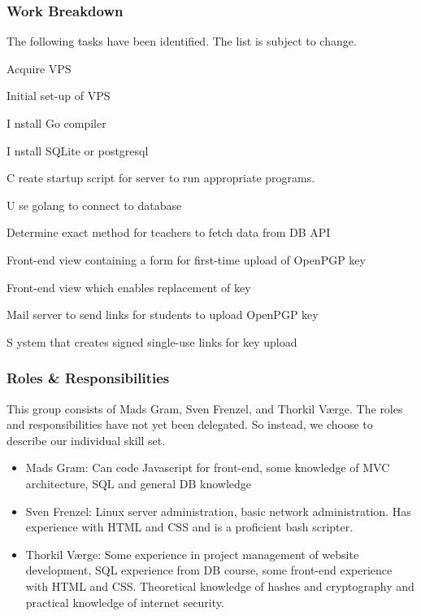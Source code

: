 \documentclass[11pt,a4paper]{report}
\let\OldItem\item
\newcommand{\SubItemStart}[1]{%
    \let\item\SubItemEnd
    \begin{SubItemList}[resume]%
        \OldItem #1%
}
\newcommand{\SubItemMiddle}[1]{%
    \OldItem #1%
}
\newcommand{\SubItemEnd}[1]{%
    \end{SubItemList}%
    \let\item\OldItem
    \item #1%
}
\newcommand*{\SubItem}[1]{%
    \let\SubItem\SubItemMiddle%
    \SubItemStart{#1}%
}%
\begin{document}
\subsubsection{Work Breakdown}
The following tasks have been identified. The list is subject to change.
\begin{itemize}
\item Acquire VPS
\item Initial set-up of VPS
\SubItem Install Go compiler
\SubItem Install SQLite or postgresql
\SubItem Create startup script for server to run appropriate programs.
\item Use golang to connect to database
\item Determine exact method for teachers to fetch data from DB API
\item Front-end view containing a form for first-time upload of OpenPGP key
\item Front-end view which enables replacement of key
\item Mail server to send links for students to upload OpenPGP key
\SubItem System that creates signed single-use links for key upload
\end{itemize}
\subsubsection{Roles \& Responsibilities}
This group consists of Mads Gram, Sven Frenzel, and Thorkil Værge. The roles and responsibilities have not yet been delegated. So instead, we choose to describe our individual skill set.
\begin{itemize}
\item Mads Gram: Can code Javascript for front-end, some knowledge of MVC architecture, SQL and general DB knowledge
\item Sven Frenzel: Linux server administration, basic network administration. Has experience with HTML and CSS and is a proficient bash scripter.
\item Thorkil Værge: Some experience in project management of website development, SQL experience from DB course, some front-end experience with HTML and CSS. Theoretical knowledge of hashes and cryptography and practical knowledge of internet security.
\end{itemize}
\end{document}

